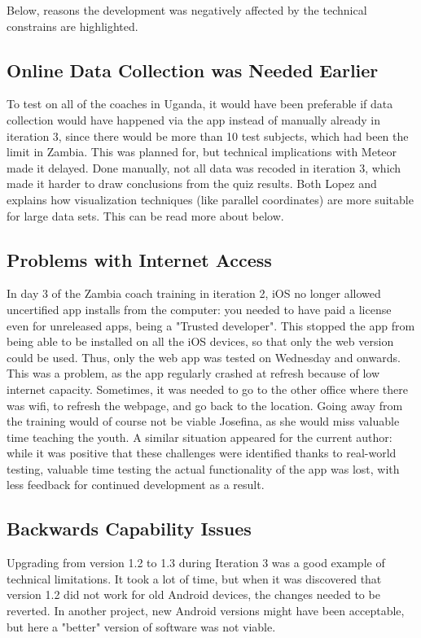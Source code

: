 Below, reasons the development was negatively affected by the technical constrains are highlighted.

\subsection{Online Data Collection was Needed Earlier}
To test on all of the coaches in Uganda, it would have been preferable if data collection would have happened via the app instead of manually already in iteration 3, since there would be more than 10 test subjects, which had been the limit in Zambia. This was planned for, but technical implications with Meteor made it delayed. Done manually, not all data was recoded in iteration 3, which made it harder to draw conclusions from the quiz results. Both Lopez \cite{une-terre} and \cite{timo-ropinski-liu} explains how visualization techniques (like parallel coordinates) are more suitable for large data sets. This can be read more about below.

\subsection{Problems with Internet Access}
In day 3 of the Zambia coach training in iteration 2, iOS no longer allowed uncertified app installs from the computer: you needed to have paid a license even for unreleased apps, being a "Trusted developer". This stopped the app from being able to be installed on all the iOS devices, so that only the web version could be used. Thus, only the web app was tested on Wednesday and onwards. This was a problem, as the app regularly crashed at refresh because of low internet capacity. Sometimes, it was needed to go to the other office where there was wifi, to refresh the webpage, and go back to the location. Going away from the training would of course not be viable Josefina, as she would miss valuable time teaching the youth. A similar situation appeared for the current author: while it was positive that these challenges were identified thanks to real-world testing, valuable time testing the actual functionality of the app was lost, with less feedback for continued development as a result.

\subsection{Backwards Capability Issues} \label{backwards-capability}
Upgrading from version 1.2 to 1.3 during Iteration 3 was a good example of technical limitations. It took a lot of time, but when it was discovered that version 1.2 did not work for old Android devices, the changes needed to be reverted. In another project, new Android versions might have been acceptable, but here a "better" version of software was not viable.

